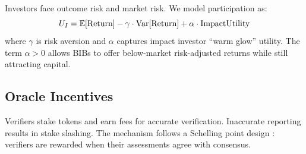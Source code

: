 Investors face outcome risk and market risk. We model participation as:
\begin{equation}
  U_I = \mathbb{E}[\text{Return}] - \gamma \cdot \text{Var}[\text{Return}]
  + \alpha \cdot \text{ImpactUtility}
\end{equation}
where $\gamma$ is risk aversion and $\alpha$ captures impact investor
``warm glow'' utility. The term $\alpha > 0$ allows BIBs to offer
below-market risk-adjusted returns while still attracting capital.

\subsection{Oracle Incentives}

Verifiers stake tokens and earn fees for accurate verification.
Inaccurate reporting results in stake slashing. The mechanism follows a
Schelling point design \citep{buterin2014schellingcoin}: verifiers are
rewarded when their assessments agree with consensus.


